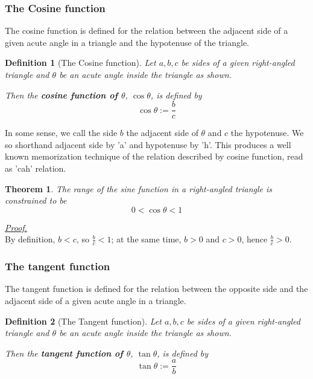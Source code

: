 \documentclass[12pt]{article}
\newtheorem{definition}{Definition}[section]
\newtheorem*{theorem}{Theorem}
\renewenvironment{proof}[1][Proof]{\begin{snugshade*} \underline{\textit{{#1}.}}\\}{\hfill \qedsymbol \end{snugshade*}}
\begin{document}
    \subsubsection*{The Cosine function}

    The cosine function is defined for the relation between the adjacent side of a given acute angle in a triangle and the hypotenuse of the triangle.

    \begin{definition}[The Cosine function]
        Let $a,b,c$ be sides of a given right-angled triangle and $\theta$ be an acute angle inside the triangle as shown.

        Then the \textbf{cosine function of $\theta$}, $\cos{\theta}$, is defined by $$\cos{\theta}:=\frac{b}{c}$$
    \end{definition}

    In some sense, we call the side $b$ the adjacent side of $\theta$ and $c$ the hypotenuse. We so shorthand adjacent side by 'a' and hypotenuse by 'h'. This produces a well known memorization technique of the relation described by cosine function, read as 'cah' relation.

    \begin{theorem}
        The range of the sine function in a right-angled triangle is constrained to be $$0<\cos{\theta}<1$$
    \end{theorem}

    \begin{proof}
        By definition, $b<c$, so $\frac{b}{c}<1$; at the same time, $b>0$ and $c>0$, hence $\frac{b}{c}>0$.
    \end{proof}

    \subsubsection*{The tangent function}

    The tangent function is defined for the relation between the opposite side and the adjacent side of a given acute angle in a triangle.

    \begin{definition}[The Tangent function]
        Let $a,b,c$ be sides of a given right-angled triangle and $\theta$ be an acute angle inside the triangle as shown.

        Then the \textbf{tangent function of $\theta$}, $\tan{\theta}$, is defined by $$\tan{\theta}:=\frac{a}{b}$$
    \end{definition}
\end{document}
